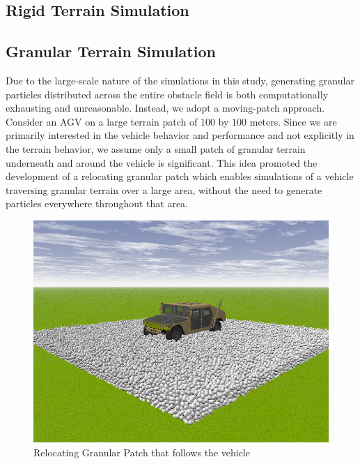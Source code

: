 \documentclass[12pt,onecolumn]{article}
\begin{document}

\subsection{Rigid Terrain Simulation}\label{sss:RigidSim}


\subsection{Granular Terrain Simulation}\label{sss:GranSim}

Due to the large-scale nature of the simulations in this study, generating granular particles distributed across the entire obstacle field is both computationally exhausting and unreasonable. Instead, we adopt a moving-patch approach. Consider an AGV on a large terrain patch of $100$ by $100$ meters. Since we are primarily interested in the vehicle behavior and performance and not explicitly in the terrain behavior, we assume only a small patch of granular terrain underneath and around the vehicle is significant. This idea promoted the development of a relocating granular patch which enables simulations of a vehicle traversing granular terrain over a large area, without the need to generate particles everywhere throughout that area. 

\begin{figure}
	\centering
	\includegraphics[width=0.8\columnwidth]{Figs/granPatch.png}
	\caption{\small Relocating Granular Patch that follows the vehicle}  
	\label{fig:granPatch}
\end{figure}
\end{document}
